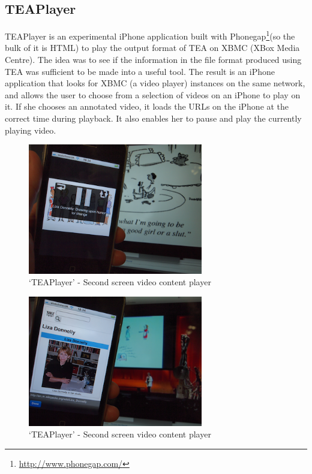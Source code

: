 \documentclass{notube}
\begin{document}
\subsection{TEAPlayer}

TEAPlayer is an experimental iPhone application built with Phonegap\footnote{\url{http://www.phonegap.com/}}(so the bulk of it is HTML) to play the output format of TEA on XBMC (XBox Media Centre). The idea was to see if the information in the file format produced using TEA was sufficient to be made into a useful tool. The result is an iPhone application that looks for XBMC (a video player) instances on the same network, and allows the user to choose from a selection of videos on an iPhone to play on it. If she chooses an annotated video, it loads the URLs on the iPhone at the correct time during playback. It also enables her to pause and play the currently playing video.

\begin{figure}[htbp]
\begin{center}
\includegraphics[width=3in]{images/tea_player1.png}
\caption{`TEAPlayer' - Second screen video content player} \label{fig:teaplayer1}
\end{center}
\end{figure} 

\begin{figure}[htbp]
\begin{center}
\includegraphics[width=3in]{images/tea_player2.png}
\caption{`TEAPlayer' - Second screen video content player} \label{fig:teaplayer2}
\end{center}
\end{figure} 
\end{document}
